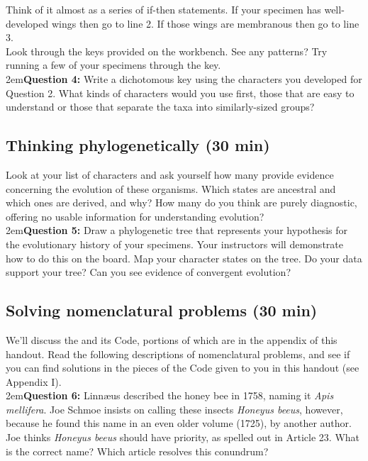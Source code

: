 \documentclass[letterpaper, 11pt]{article}
\begin{document}
\noindent{}Think of it almost as a series of if-then statements. If your specimen has well-developed wings then go to line 2. If those wings are membranous then go to line 3.\\

\noindent{}Look through the keys provided on the workbench. See any patterns? Try running a few of your specimens through the key. \\

\hangindent2em\textbf{Question 4:} Write a dichotomous key using the characters you developed for Question 2. What kinds of characters would you use first, those that are easy to understand or those that separate the taxa into similarly-sized groups?\\

\subsection{Thinking phylogenetically (30 min)}
Look at your list of characters and ask yourself how many provide evidence concerning the evolution of these organisms. Which states are ancestral and which ones are derived, and why? How many do you think are purely diagnostic, offering no usable information for understanding evolution?\\

\hangindent2em\textbf{Question 5:} Draw a phylogenetic tree that represents your hypothesis for the evolutionary history of your specimens. Your instructors will demonstrate how to do this on the board. Map your character states on the tree. Do your data support your tree? Can you see evidence of convergent evolution?\\

\subsection{Solving nomenclatural problems (30 min)}

We'll discuss the \cite{iczn} and its Code, portions of which are in the appendix of this handout. Read the following descriptions of nomenclatural problems, and see if you can find solutions in the pieces of the Code given to you in this handout (see Appendix I). \\

\hangindent2em\textbf{Question 6:} Linn\ae{}us described the honey bee in 1758, naming it \textit{Apis mellifera}. Joe Schmoe insists on calling these insects \textit{Honeyus beeus}, however, because he found this name in an even older volume (1725), by another author. Joe thinks \textit{Honeyus beeus} should have priority, as spelled out in Article 23. What is the correct name? Which article resolves this conundrum?\\
\end{document}
